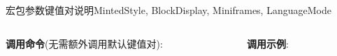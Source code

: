 \begin{frame}{ 宏包参数键值对说明}{MintedStyle, BlockDisplay, Miniframes, LanguageMode}
	\vspace*{-1.6ex}
	\begin{columns}[T, onlytextwidth]%
		\begin{column}{.5\textwidth}
			\textbf{调用命令}(无需额外调用默认键值对):\\
		\end{column}
		\begin{column}{.5\textwidth}
			\textbf{调用示例}:\\
		\end{column}
	\end{columns}


\end{frame}
